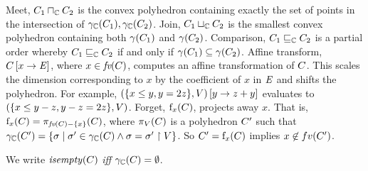  \myitem{} Meet, $ C_1 \sqcap_{\mathbb{C}} C_2 $ is the convex
 polyhedron containing exactly the set of points in the intersection of
 $\gamma_{\mathbb{C}}(C_1), \gamma_{\mathbb{C}}(C_2)$.
\myitem{} Join, $C_1 \sqcup_{\mathbb{C}} C_2$ is the smallest convex
 polyhedron containing both $\gamma(C_1)$ and $\gamma(C_2)$.
\myitem{} Comparison, $C_1 \sqsubseteq_{\mathbb{C}} C_2$ is a partial order whereby $C_1 \sqsubseteq_{\mathbb{C}} C_2$ if and only if $\gamma(C_1) \subseteq \gamma(C_2)$.
\myitem{} Affine transform, $C \left[ x \rightarrow \mathit{E} \right]$, where $x
  \in \textit{fv}(C) $, computes an affine transformation of $ C $.  This scales
  the dimension corresponding to $x$ by the coefficient of $x$ in
  $\mathit{E}$ and shifts the polyhedron.  For example, $\left( \{x \leq y, y =
  2z\}, V \right) \left[ y \rightarrow z + y \right]$ evaluates to $\left( \{x \leq y - z, y - z =
  2z\}, V \right)$.
\myitem{} Forget, $\mathrm{f}_{x}(C)$, projects
  away $x$.  That is, $\mathrm{f}_{x}(C) =
  \pi_{\textit{fv}(C)-\{x\}}(C)$, where $\pi_V(C)$ is a polyhedron
  $C'$ such that $\gamma_{\mathbb{C}}(C') = \{ \sigma \mid \sigma' \in
  \gamma_{\mathbb{C}}(C) \wedge \sigma = \sigma' \upharpoonright V \}$.  So $C' =
  \mathrm{f}_{x}(C)$ implies $x \not\in fv(C')$.

We write $\mathit{isempty}(C)$ \emph{iff} $\gamma_{\mathbb{C}}(C) = \emptyset$.


